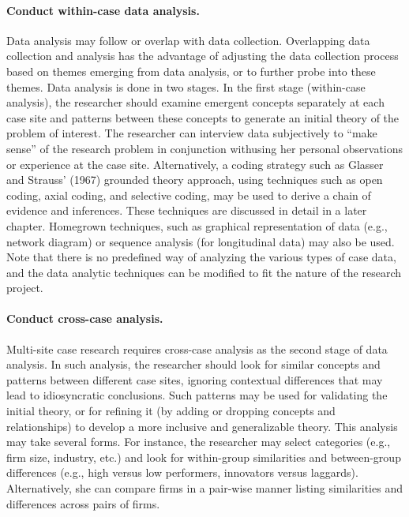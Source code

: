 \paragraph{Conduct within-case data analysis.} Data analysis may follow or overlap with data collection. Overlapping data collection and analysis has the advantage of adjusting the data collection process based on themes emerging from data analysis, or to further probe into these themes. Data analysis is done in two stages. In the first stage (within-case analysis), the researcher should examine emergent concepts separately at each case site and patterns between these concepts to generate an initial theory of the problem of interest. The researcher can interview data subjectively to “make sense” of the research problem in conjunction withusing her personal observations or experience at the case site. Alternatively, a coding strategy such as Glasser and Strauss’ (1967) grounded theory approach, using techniques such as open coding, axial coding, and selective coding, may be used to derive a chain of evidence and inferences. These techniques are discussed in detail in a later chapter. Homegrown techniques, such as graphical representation of data (e.g., network diagram) or sequence analysis (for longitudinal data) may also be used. Note that there is no predefined way of analyzing the various types of case data, and the data analytic techniques can be modified to fit the nature of the research project.

\paragraph{Conduct cross-case analysis.} Multi-site case research requires cross-case analysis as the second stage of data analysis. In such analysis, the researcher should look for similar concepts and patterns between different case sites, ignoring contextual differences that may lead to idiosyncratic conclusions. Such patterns may be used for validating the initial theory, or for refining it (by adding or dropping concepts and relationships) to develop a more inclusive and generalizable theory. This analysis may take several forms. For instance, the researcher may select categories (e.g., firm size, industry, etc.) and look for within-group similarities and between-group differences (e.g., high versus low performers, innovators versus laggards). Alternatively, she can compare firms in a pair-wise manner listing similarities and differences across pairs of firms.

